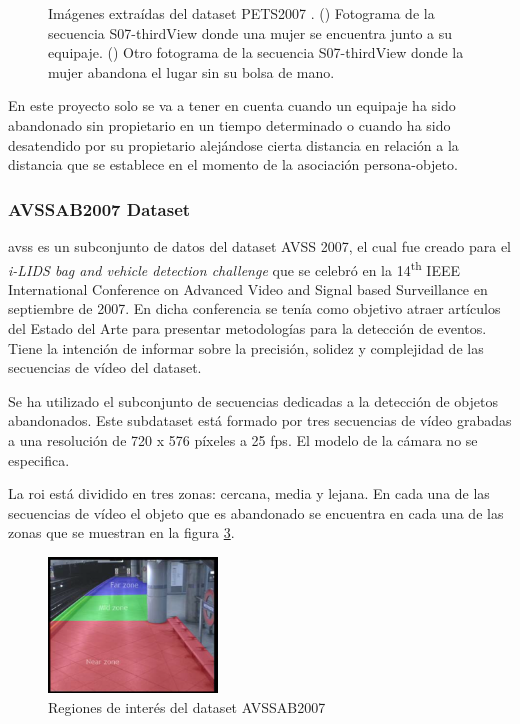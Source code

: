 \begin{figure}[ht]
\begin{subfigure}[b]{0.4\textwidth}
    \caption{}
    \label{fig:pets2007_4}
  \end{subfigure}
  \caption{Imágenes extraídas del dataset PETS2007 \cite{pets2007-dataset}.
    (\protect{}) Fotograma de la secuencia S07-thirdView donde una mujer se encuentra junto a su equipaje.
    (\protect{}) Otro fotograma de la secuencia S07-thirdView donde la mujer abandona el lugar sin su bolsa de mano.}
  \label{fig:pets2007_S07}
\end{figure}

En este proyecto solo se va a tener en cuenta cuando un equipaje ha sido abandonado sin propietario en un tiempo determinado o cuando ha sido desatendido por su propietario alejándose cierta distancia en relación a la distancia que se establece en el momento de la asociación persona-objeto.

\subsubsection{AVSSAB2007 Dataset}

\gls{avss} \cite{AVSSAB2007-dataset} es un subconjunto de datos del dataset AVSS 2007, el cual fue creado para el \textit{i-LIDS bag and vehicle detection challenge} que se celebró en la 14\textsuperscript{th} IEEE International Conference on Advanced Video and Signal based Surveillance en septiembre de 2007. En dicha conferencia se tenía como objetivo atraer artículos del Estado del Arte para presentar metodologías para la detección de eventos. Tiene la intención de informar sobre la precisión, solidez y complejidad de las secuencias de vídeo del dataset.

Se ha utilizado el subconjunto de secuencias dedicadas a la detección de objetos abandonados. Este subdataset está formado por tres secuencias de vídeo grabadas a una resolución de 720 x 576 píxeles a 25 \gls{fps}. El modelo de la cámara no se especifica.

La \gls{roi} está dividido en tres zonas: cercana, media y lejana. En cada una de las secuencias de vídeo el objeto que es abandonado se encuentra en cada una de las zonas que se muestran en la figura \ref{fig:avssab2007-zones}.

\begin{figure}[ht]
\centering
\includegraphics[width=0.4\textwidth]{img/chapters/resultados/datasets/avssab2007-zones.png}
\caption{\label{fig:avssab2007-zones}Regiones de interés del dataset AVSSAB2007 \cite{AVSSAB2007-dataset}}
\end{figure}

